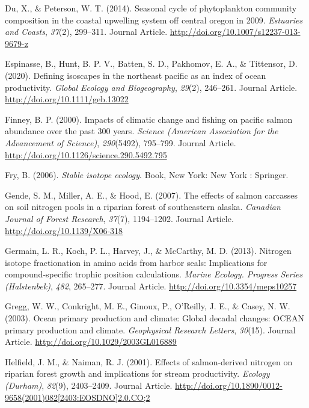 \documentclass [11pt, proquest] {uwthesis}[2015/03/03]
\begin{document}
\hypertarget{ref-Du2014}{}
Du, X., \& Peterson, W. T. (2014). Seasonal cycle of phytoplankton
community composition in the coastal upwelling system off central oregon
in 2009. \emph{Estuaries and Coasts}, \emph{37}(2), 299--311. Journal
Article. \url{http://doi.org/10.1007/s12237-013-9679-z}

\hypertarget{ref-Espinasse2020}{}
Espinasse, B., Hunt, B. P. V., Batten, S. D., Pakhomov, E. A., \&
Tittensor, D. (2020). Defining isoscapes in the northeast pacific as an
index of ocean productivity. \emph{Global Ecology and Biogeography},
\emph{29}(2), 246--261. Journal Article.
\url{http://doi.org/10.1111/geb.13022}

\hypertarget{ref-Finney2000}{}
Finney, B. P. (2000). Impacts of climatic change and fishing on pacific
salmon abundance over the past 300 years. \emph{Science (American
Association for the Advancement of Science)}, \emph{290}(5492),
795--799. Journal Article.
\url{http://doi.org/10.1126/science.290.5492.795}

\hypertarget{ref-Fry2006}{}
Fry, B. (2006). \emph{Stable isotope ecology}. Book, New York: New York
: Springer.

\hypertarget{ref-Gende2007}{}
Gende, S. M., Miller, A. E., \& Hood, E. (2007). The effects of salmon
carcasses on soil nitrogen pools in a riparian forest of southeastern
alaska. \emph{Canadian Journal of Forest Research}, \emph{37}(7),
1194--1202. Journal Article. \url{http://doi.org/10.1139/X06-318}

\hypertarget{ref-Germain2013}{}
Germain, L. R., Koch, P. L., Harvey, J., \& McCarthy, M. D. (2013).
Nitrogen isotope fractionation in amino acids from harbor seals:
Implications for compound-specific trophic position calculations.
\emph{Marine Ecology. Progress Series (Halstenbek)}, \emph{482},
265--277. Journal Article. \url{http://doi.org/10.3354/meps10257}

\hypertarget{ref-Gregg2003}{}
Gregg, W. W., Conkright, M. E., Ginoux, P., O'Reilly, J. E., \& Casey,
N. W. (2003). Ocean primary production and climate: Global decadal
changes: OCEAN primary production and climate. \emph{Geophysical
Research Letters}, \emph{30}(15). Journal Article.
\url{http://doi.org/10.1029/2003GL016889}

\hypertarget{ref-Helfield2001}{}
Helfield, J. M., \& Naiman, R. J. (2001). Effects of salmon-derived
nitrogen on riparian forest growth and implications for stream
productivity. \emph{Ecology (Durham)}, \emph{82}(9), 2403--2409. Journal
Article.
\href{http://doi.org/10.1890/0012-9658(2001)082\%5B2403:EOSDNO\%5D2.0.CO;2}{http://doi.org/10.1890/0012-9658(2001)082{[}2403:EOSDNO{]}2.0.CO;2}
\end{document}
